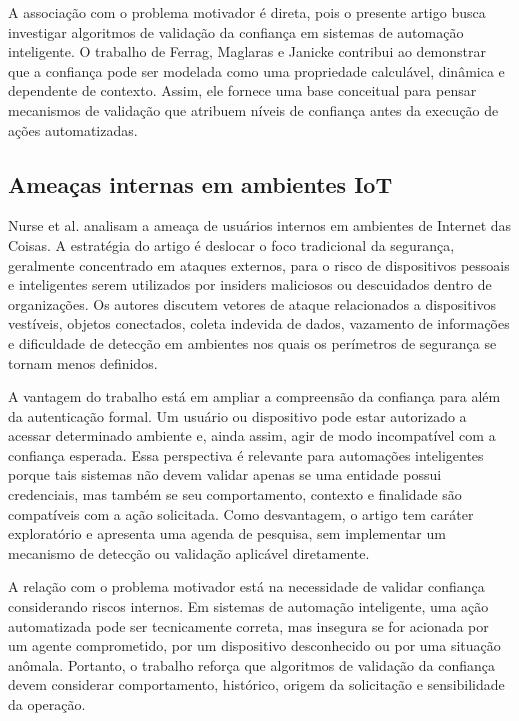 \documentclass[12pt]{article}
\begin{document}
A associação com o problema motivador é direta, pois o presente artigo busca investigar algoritmos de validação da confiança em sistemas de automação inteligente. O trabalho de Ferrag, Maglaras e Janicke contribui ao demonstrar que a confiança pode ser modelada como uma propriedade calculável, dinâmica e dependente de contexto. Assim, ele fornece uma base conceitual para pensar mecanismos de validação que atribuem níveis de confiança antes da execução de ações automatizadas.

\subsection{Ameaças internas em ambientes IoT}

Nurse et al. \cite{nurse2015} analisam a ameaça de usuários internos em ambientes de Internet das Coisas. A estratégia do artigo é deslocar o foco tradicional da segurança, geralmente concentrado em ataques externos, para o risco de dispositivos pessoais e inteligentes serem utilizados por insiders maliciosos ou descuidados dentro de organizações. Os autores discutem vetores de ataque relacionados a dispositivos vestíveis, objetos conectados, coleta indevida de dados, vazamento de informações e dificuldade de detecção em ambientes nos quais os perímetros de segurança se tornam menos definidos.

A vantagem do trabalho está em ampliar a compreensão da confiança para além da autenticação formal. Um usuário ou dispositivo pode estar autorizado a acessar determinado ambiente e, ainda assim, agir de modo incompatível com a confiança esperada. Essa perspectiva é relevante para automações inteligentes porque tais sistemas não devem validar apenas se uma entidade possui credenciais, mas também se seu comportamento, contexto e finalidade são compatíveis com a ação solicitada. Como desvantagem, o artigo tem caráter exploratório e apresenta uma agenda de pesquisa, sem implementar um mecanismo de detecção ou validação aplicável diretamente.

A relação com o problema motivador está na necessidade de validar confiança considerando riscos internos. Em sistemas de automação inteligente, uma ação automatizada pode ser tecnicamente correta, mas insegura se for acionada por um agente comprometido, por um dispositivo desconhecido ou por uma situação anômala. Portanto, o trabalho reforça que algoritmos de validação da confiança devem considerar comportamento, histórico, origem da solicitação e sensibilidade da operação.
\end{document}
